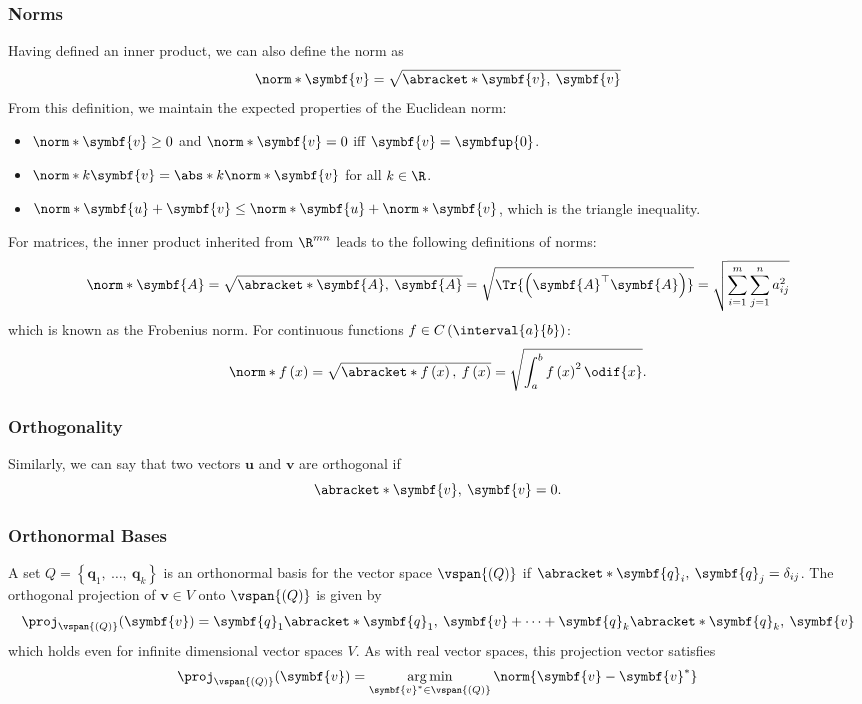 \documentclass{article}
\DeclareMathOperator*{\argmin}{arg\,min}
\begin{document}
\subsubsection{Norms}
Having defined an inner product, we can also define the norm as
\begin{equation*}
    \norm*{\symbf{v}} = \sqrt{\abracket*{\symbf{v},\: \symbf{v}}}
\end{equation*}
From this definition, we maintain the expected properties of the Euclidean norm:
\begin{itemize}
    \item \(\norm*{\symbf{v}} \geq 0\) and \(\norm*{\symbf{v}} = 0\) iff \(\symbf{v} = \symbfup{0}\).
    \item \(\norm*{k \symbf{v}} = \abs*{k} \norm*{\symbf{v}}\) for all \(k \in \R\).
    \item \(\norm*{\symbf{u} + \symbf{v}} \leq \norm*{\symbf{u}} + \norm*{\symbf{v}}\), which is the triangle inequality.
\end{itemize}
For matrices, the inner product inherited from \(\R^{mn}\) leads to the following definitions of norms:
\begin{equation*}
    \norm*{\symbf{A}} = \sqrt{\abracket*{\symbf{A},\: \symbf{A}}} = \sqrt{\Tr{\left( \symbf{A}^\top \symbf{A} \right)}} = \sqrt{\sum_{i = 1}^m \sum_{j = 1}^n a_{ij}^2}
\end{equation*}
which is known as the Frobenius norm. For continuous functions \(f \in C\left( \interval{a}{b} \right)\):\
\begin{equation*}
    \norm*{f\left( x \right)} = \sqrt{\abracket*{f\left( x \right),\: f\left( x \right)}} = \sqrt{\int_a^b f\left( x \right)^2 \odif{x}}.
\end{equation*}
\subsubsection{Orthogonality}
Similarly, we can say that two vectors \(\symbf{u}\) and \(\symbf{v}\)
are orthogonal if
\begin{equation*}
    \abracket*{\symbf{v},\: \symbf{v}} = 0.
\end{equation*}
\subsubsection{Orthonormal Bases}
A set \(Q = \left\{ \symbf{q}_1,\: \dots,\: \symbf{q}_k \right\}\) is
an orthonormal basis for the vector space \(\vspan{\left( Q \right)}\)
if \(\abracket*{\symbf{q}_i,\: \symbf{q}_j} = \delta_{ij}\).
The orthogonal projection of \(\symbf{v} \in V\) onto \(\vspan{\left( Q
\right)}\) is given by
\begin{equation*}
    \proj_{\vspan{\left( Q \right)}}{\left( \symbf{v} \right)} = \symbf{q}_1 \abracket*{\symbf{q}_1,\: \symbf{v}} + \cdots + \symbf{q}_k \abracket*{\symbf{q}_k,\: \symbf{v}}
\end{equation*}
which holds even for infinite dimensional vector spaces \(V\). As with real vector spaces, this projection vector satisfies
\begin{equation*}
    \proj_{\vspan{\left( Q \right)}}{\left( \symbf{v} \right)} = \argmin_{\symbf{v}^\ast \in \vspan{\left( Q \right)}} \norm{\symbf{v} - \symbf{v}^\ast}
\end{equation*}
\end{document}
